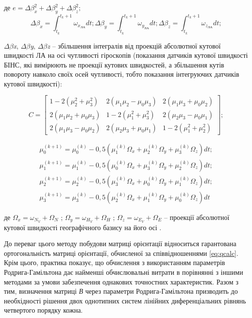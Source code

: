 \begin{ESKDexplanation}
\item де   $e=\Delta \beta_{x}^{2} +\Delta \beta_{y}^{2} +\Delta \beta_{z}^{2} ;$
\[\Delta \beta_{x} =\int_{t_{k}}^{t_{k} +1}\omega_{x_{\text{ЛА}}} dt ;   
 \Delta \beta_{y} =\int_{t_{k}}^{t_{k} +1}\omega_{y_{\text{ЛА}}} dt ;   
 \Delta \beta_{z} =\int_{t_{k}}^{t_{k} +1}\omega_{z_{\text{ЛА}}} dt ;\] 

\item $\Delta $$\beta $\textit{x}, $\Delta $$\beta $\textit{y}, $\Delta $$\beta $\textit{z }-- збільшення 
інтегралів від проекцій абсолютної кутової швидкості ЛА на осі чутливості гіроскопів 
(показання датчиків кутової швидкості БІНС, які вимірюють не проекції кутових швидкостей, 
а збільшення кутів повороту навколо своїх осей чутливості, тобто показання інтегруючих 
датчиків кутової швидкості):
\end{ESKDexplanation}
\[C=\left[\begin{array}{ccc} 
{1-2(\mu_{2}^{2} +\mu_{3}^{2} )} & {2(\mu_{1} \mu_{2} -\mu_{0} \mu_{3} )} & {2(\mu_{1} \mu_{3} +\mu_{0} \mu_{2} )} \\ 
{2(\mu_{1} \mu_{2} +\mu_{0} \mu_{3} )} & {1-2(\mu_{1}^{2} +\mu_{3}^{2} )} & {2(\mu_{2} \mu_{3} -\mu_{0} \mu_{1} )} \\ 
{2(\mu_{1} \mu_{3} -\mu_{0} \mu_{2} )} & {2(\mu_{2} \mu_{3} +\mu_{0} \mu_{1} )} & {1-2(\mu_{1}^{2} +\mu_{2}^{2} )} 
\end{array}  \right];\] 

\[\begin{array}{l} 
{\mu_{0}^{(k+1)}=\mu_{0}^{(k)} -0,5\left(\mu_{1}^{(k)} \Omega_{x} +\mu_{2}^{(k)} \Omega_{y}+\mu_{3}^{(k)} \Omega_{z} \right) dt;}\\ 
{\mu_{1}^{(k+1)}=\mu_{1}^{(k)} -0,5\left(\mu_{0}^{(k)} \Omega_{x} +\mu_{3}^{(k)} \Omega_{y}+\mu_{2}^{(k)} \Omega_{z} \right) dt;} \\ 
{\mu_{2}^{(k+1)}=\mu_{2}^{(k)} -0,5\left(\mu_{3}^{(k)} \Omega_{x} +\mu_{0}^{(k)} \Omega_{y}+\mu_{1}^{(k)} \Omega_{z} \right) dt;} \\ 
{\mu_{3}^{(k+1)}=\mu_{3}^{(k)} -0,5\left(\mu_{2}^{(k)} \Omega_{x} +\mu_{1}^{(k)} \Omega_{y} +\mu_{0}^{(k)} \Omega_{z} \right) dt} 
\end{array}\] 

\begin{ESKDexplanation}
\item де $\Omega_{x} =\omega_{N_{V}} +\Omega_{N}$ ;  $\Omega_{y} =\omega_{H_{V} 
} +\Omega_{H}$ ;  $\Omega_{z} =\omega_{E_{V}} +\Omega_{E} $ -- проекції абсолютної 
кутової швидкості географічного базису на його осі .
\end{ESKDexplanation}
До переваг цього методу побудови матриці орієнтації відноситься гарантована ортогональність 
матриці орієнтації, обчисленої за співвідношеннями \eqref{eq:qcalc}. Крім цього, 
практика показує, що обчислення з використанням параметрів Родрига-Гамільтона дає 
найменші обчислювальні витрати в порівнянні з іншими методами за умови забезпечення 
однакових точностних характеристик. Разом з тим, визначення матриці \textit{В }через 
параметри Родрига-Гамільтона призводить до необхідності рішення двох однотипних систем 
лінійних диференціальних рівнянь четвертого порядку кожна.

